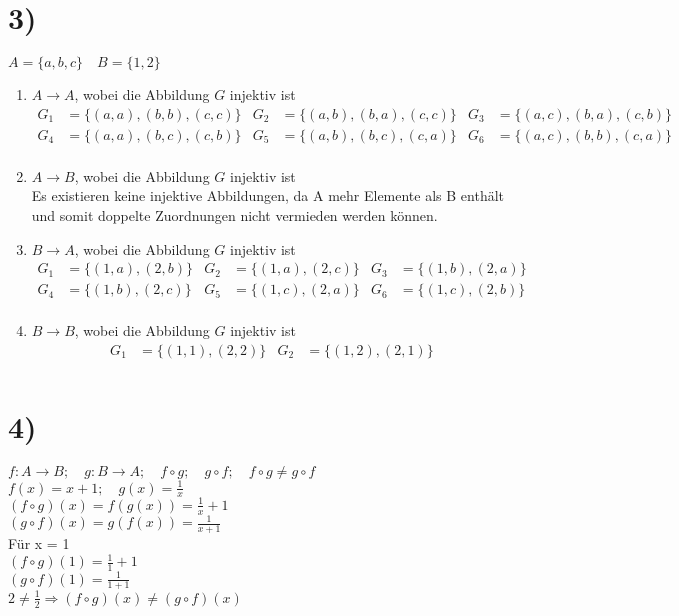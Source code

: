 \documentclass{alex_hü}
\begin{document}
	\section*{3)}
		$A = \{a,b,c\}\quad B = \{1,2\}$
	
	\begin{enumerate}
		\item $A \to A$, wobei die Abbildung $G$ injektiv ist
			\begin{align*}
				G_{1} &= \{(a,a),(b,b),(c,c)\}
				&G_{2} &= \{(a,b),(b,a),(c,c)\}
				&G_{3} &= \{(a,c),(b,a),(c,b)\} \\
				G_{4} &= \{(a,a),(b,c),(c,b)\}
				&G_{5} &= \{(a,b),(b,c),(c,a)\}
				&G_{6} &= \{(a,c),(b,b),(c,a)\} \\
			\end{align*}
		\item $A \to B$, wobei die Abbildung $G$ injektiv ist \\[3ex]
			Es existieren keine injektive Abbildungen, da A mehr Elemente als B enthält und somit doppelte Zuordnungen nicht vermieden werden können. \\
		\item $B \to A$, wobei die Abbildung $G$ injektiv ist
			\begin{align*}
				G_{1} &= \{(1,a),(2,b)\}
				&G_{2} &= \{(1,a),(2,c)\}
				&G_{3} &= \{(1,b),(2,a)\} \\
				G_{4} &= \{(1,b),(2,c)\}
				&G_{5} &= \{(1,c),(2,a)\}
				&G_{6} &= \{(1,c),(2,b)\} \\
			\end{align*}
		\item $B \to B$, wobei die Abbildung $G$ injektiv ist
			\begin{align*}
				G_{1} &= \{(1,1),(2,2)\}
				&G_{2} &= \{(1,2),(2,1)\} \\
			\end{align*}		
		
	\end{enumerate}

	\section*{4)}
	$f:A \to B; \quad g:B \to A; \quad f\circ g; \quad g\circ f; \quad f\circ g \neq g\circ f $\\[1ex]
	$f(x) = x+1; \quad g(x) = \frac{1}{x} $\\[1ex]
	$(f \circ g)(x) = f(g(x)) = \frac{1}{x}+1$\\
	$(g \circ f)(x) = g(f(x)) = \frac{1}{x+1}$\\[2ex]
	Für x = 1\\
	$(f \circ g)(1) = \frac{1}{1}+1$\\
	$(g \circ f)(1) = \frac{1}{1+1}$\\[2ex]
	$2 \neq \frac{1}{2} \Rightarrow (f \circ g)(x) \neq (g \circ f)(x)$
	
\end{document}
